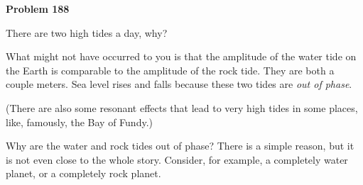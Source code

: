 \documentclass[12pt]{article}
\begin{document}
\begin{pottproblem}
\textbf{Problem 188}

There are two high tides a day, why?

What might not have occurred to you is that the amplitude of the water
tide on the Earth is comparable to the amplitude of the rock
tide. They are both a couple meters. Sea level rises and falls because these
two tides are \emph{out of phase}.

(There are also some resonant effects that lead to very high tides in
some places, like, famously, the Bay of Fundy.)

Why are the water and rock tides out of phase? There is a simple
reason, but it is not even close to the whole story. Consider, for
example, a completely water planet, or a completely rock planet.

\end{pottproblem}
\end{document}
